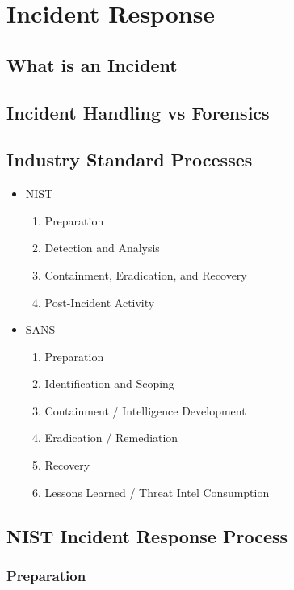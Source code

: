

\section{Incident Response}\label{sec:incident-response}

\subsection{What is an Incident}
\subsection{Incident Handling vs Forensics}
\subsection{Industry Standard Processes}
\begin{itemize}
    \item NIST
    \begin{enumerate}
        \item Preparation
        \item Detection and Analysis
        \item Containment, Eradication, and Recovery
        \item Post-Incident Activity
    \end{enumerate}
    \item SANS
    \begin{enumerate}
        \item Preparation
        \item Identification and Scoping
        \item Containment / Intelligence Development
        \item Eradication / Remediation
        \item Recovery
        \item Lessons Learned / Threat Intel Consumption
    \end{enumerate}
\end{itemize}
\subsection{NIST Incident Response Process}
\subsubsection{Preparation}

